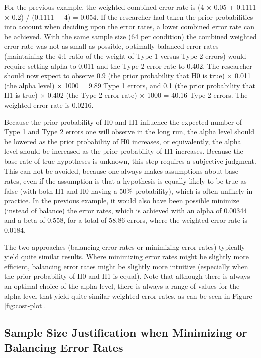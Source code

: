 \documentclass[
  english,
  ,man, a4paper,floatsintext]{apa6}
\begin{document}
For the previous example, the weighted combined error rate is (4 × 0.05 + 0.1111 × 0.2) / (0.1111 + 4) = 0.054. If the researcher had taken the prior probabilities into account when deciding upon the error rates, a lower combined error rate can be achieved. With the same sample size (64 per condition) the combined weighted error rate was not as small as possible, optimally balanced error rates (maintaining the 4:1 ratio of the weight of Type 1 versus Type 2 errors) would require setting alpha to 0.011 and the Type 2 error rate to 0.402. The researcher should now expect to observe 0.9 (the prior probability that H0 is true) × 0.011 (the alpha level) × 1000 = 9.89 Type 1 errors, and 0.1 (the prior probability that H1 is true) × 0.402 (the Type 2 error rate) × 1000 = 40.16 Type 2 errors. The weighted error rate is 0.0216.

Because the prior probability of H0 and H1 influence the expected number of Type 1 and Type 2 errors one will observe in the long run, the alpha level should be lowered as the prior probability of H0 increases, or equivalently, the alpha level should be increased as the prior probability of H1 increases. Because the base rate of true hypotheses is unknown, this step requires a subjective judgment. This can not be avoided, because one always makes assumptions about base rates, even if the assumption is that a hypothesis is equally likely to be true as false (with both H1 and H0 having a 50\% probability), which is often unlikely in practice. In the previous example, it would also have been possible minimize (instead of balance) the error rates, which is achieved with an alpha of 0.00344 and a beta of 0.558, for a total of 58.86 errors, where the weighted error rate is 0.0184.

The two approaches (balancing error rates or minimizing error rates) typically yield quite similar results. Where minimizing error rates might be slightly more efficient, balancing error rates might be slightly more intuitive (especially when the prior probability of H0 and H1 is equal). Note that although there is always an optimal choice of the alpha level, there is always a range of values for the alpha level that yield quite similar weighted error rates, as can be seen in Figure \ref{fig:cost-plot}.

\hypertarget{sample-size-justification-when-minimizing-or-balancing-error-rates}{%
\subsection{Sample Size Justification when Minimizing or Balancing Error Rates}\label{sample-size-justification-when-minimizing-or-balancing-error-rates}}
\end{document}
